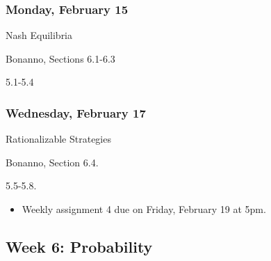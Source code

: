 \documentclass[
]{article}
\providecommand{\tightlist}{%
  \setlength{\itemsep}{0pt}\setlength{\parskip}{0pt}}
\begin{document}
\begin{multicols}{2}

\hypertarget{monday-february-15}{%
\subsubsection{Monday, February 15}\label{monday-february-15}}

\begin{description}
\tightlist
\item[Topic]
Nash Equilibria
\item[Reading]
Bonanno, Sections 6.1-6.3
\item[Lectures]
5.1-5.4
\end{description}

\hypertarget{wednesday-february-17}{%
\subsubsection{Wednesday, February 17}\label{wednesday-february-17}}

\begin{description}
\tightlist
\item[Topic]
Rationalizable Strategies
\item[Reading]
Bonanno, Section 6.4.
\item[Lectures]
5.5-5.8.
\end{description}

\end{multicols}

\begin{itemize}
\tightlist
\item
  Weekly assignment 4 due on Friday, February 19 at 5pm.
\end{itemize}

\hypertarget{week-6-probability}{%
\subsection{Week 6: Probability}\label{week-6-probability}}
\end{document}
